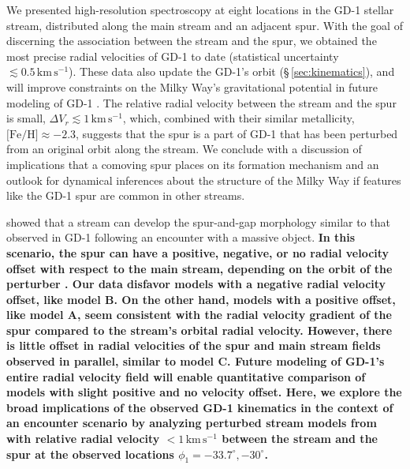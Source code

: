 \documentclass[twocolumn]{aastex63}
\newcommand{\kms}{\ensuremath{\textrm{km}\,\textrm{s}^{-1}}}
\newcommand{\feh}{\ensuremath{\textrm{[Fe/H]}}}
\newcommand{\changes}[1]{{\textbf{#1}}}
\begin{document}
We presented high-resolution spectroscopy at eight locations in the GD-1 stellar stream, distributed along the main stream and an adjacent spur.
With the goal of discerning the association between the stream and the spur, we obtained the most precise radial velocities of GD-1 to date (statistical uncertainty $\lesssim0.5\,\kms$).
These data also update the GD-1's orbit (\S\,\ref{sec:kinematics}), and will improve constraints on the Milky Way's gravitational potential in future modeling of GD-1 \citep[e.g.,][]{koposov2010, bowden2015}.
The relative radial velocity between the stream and the spur is small, $\Delta V_r\lesssim1\,\kms$, which, combined with their similar metallicity, $\feh\approx-2.3$, suggests that the spur is a part of GD-1 that has been perturbed from an original orbit along the stream.
We conclude with a discussion of implications that a comoving spur places on its formation mechanism and an outlook for dynamical inferences about the structure of the Milky Way if features like the GD-1 spur are common in other streams.

\citet{bonaca2019a} showed that a stream can develop the spur-and-gap morphology similar to that observed in GD-1 following an encounter with a massive object.
\changes{
In this scenario, the spur can have a positive, negative, or no radial velocity offset with respect to the main stream, depending on the orbit of the perturber \citep[their models A, B, and C, respectively]{bonaca2019a}.
Our data disfavor models with a negative radial velocity offset, like model B.
On the other hand, models with a positive offset, like model A, seem consistent with the radial velocity gradient of the spur compared to the stream's orbital radial velocity.
However, there is little offset in radial velocities of the spur and main stream fields observed in parallel, similar to model C.
Future modeling of GD-1's entire radial velocity field will enable quantitative comparison of models with slight positive and no velocity offset.
Here, we explore the broad implications of the observed GD-1 kinematics in the context of an encounter scenario by analyzing perturbed stream models from \citet{bonaca2019a} with relative radial velocity $<1\,\kms$ between the stream and the spur at the observed locations $\phi_1=-33.7^\circ,-30^\circ$.
}
\end{document}
